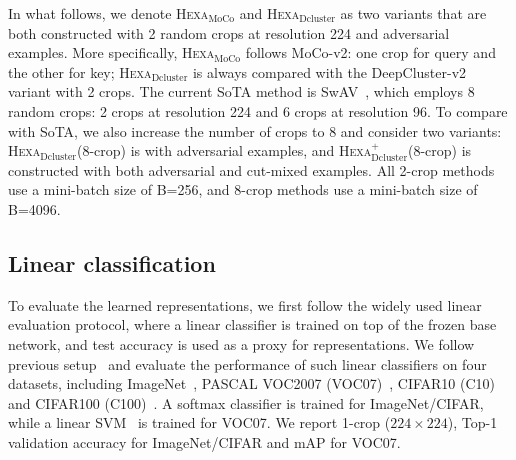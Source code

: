 \documentclass[10pt,twocolumn,letterpaper]{article}
\newcommand{\shortname}{\textsc{Hexa}}
\begin{document}
In what follows, we denote \shortname{}$_{\text{MoCo}}$ and \shortname{}$_{\text{Dcluster}}$ as two variants that are both constructed with 2 random crops at resolution 224 and adversarial examples. 
More specifically, \shortname{}$_{\text{MoCo}}$ follows MoCo-v2: one crop for query and the other for key; \shortname{}$_{\text{Dcluster}}$ is always compared with the DeepCluster-v2 variant with 2 crops. 
The current SoTA method is SwAV~\cite{caron2020unsupervised}, which employs 8 random crops: 2 crops at resolution 224 and 6 crops at resolution 96. To compare with SoTA,  we also increase the number of crops to 8 and consider two variants: \shortname{}$_{\text{Dcluster}}$(8-crop) is with adversarial examples, and \shortname{}$_{\text{Dcluster}}^{+}$(8-crop) is constructed with both adversarial and cut-mixed examples. 
All 2-crop methods use a mini-batch size of B=256, and 8-crop methods use a mini-batch size of B=4096.

\subsection{Linear classification}
To evaluate the learned representations, we first follow the widely used
linear evaluation protocol, where a linear classifier is trained on top of the frozen base network, and test accuracy is used as a proxy for representations. We follow previous setup~\cite{goyal2019scaling} and evaluate the performance of such linear classifiers on four datasets, including ImageNet~\cite{deng2009imagenet}, PASCAL VOC2007 (VOC07)~\cite{everingham2010pascal}, CIFAR10 (C10) and CIFAR100 (C100)~\cite{krizhevsky2009learning}.  A softmax classifier is trained for ImageNet/CIFAR, while a linear SVM~\cite{fan2008liblinear} is trained for VOC07. We report 1-crop ($224\times224$), Top-1 validation accuracy for ImageNet/CIFAR and mAP for VOC07.
\end{document}
